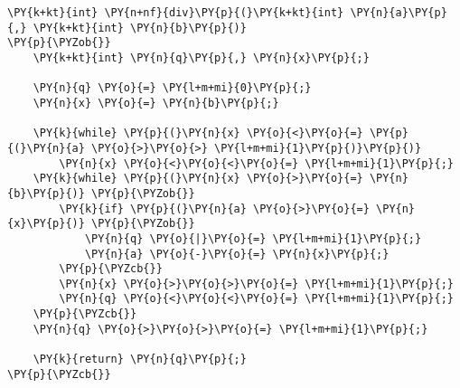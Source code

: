\begin{Verbatim}[commandchars=\\\{\}]
\PY{k+kt}{int} \PY{n+nf}{div}\PY{p}{(}\PY{k+kt}{int} \PY{n}{a}\PY{p}{,} \PY{k+kt}{int} \PY{n}{b}\PY{p}{)}
\PY{p}{\PYZob{}}
    \PY{k+kt}{int} \PY{n}{q}\PY{p}{,} \PY{n}{x}\PY{p}{;}

    \PY{n}{q} \PY{o}{=} \PY{l+m+mi}{0}\PY{p}{;}
    \PY{n}{x} \PY{o}{=} \PY{n}{b}\PY{p}{;}

    \PY{k}{while} \PY{p}{(}\PY{n}{x} \PY{o}{<}\PY{o}{=} \PY{p}{(}\PY{n}{a} \PY{o}{>}\PY{o}{>} \PY{l+m+mi}{1}\PY{p}{)}\PY{p}{)}
        \PY{n}{x} \PY{o}{<}\PY{o}{<}\PY{o}{=} \PY{l+m+mi}{1}\PY{p}{;}
    \PY{k}{while} \PY{p}{(}\PY{n}{x} \PY{o}{>}\PY{o}{=} \PY{n}{b}\PY{p}{)} \PY{p}{\PYZob{}}
        \PY{k}{if} \PY{p}{(}\PY{n}{a} \PY{o}{>}\PY{o}{=} \PY{n}{x}\PY{p}{)} \PY{p}{\PYZob{}}
            \PY{n}{q} \PY{o}{|}\PY{o}{=} \PY{l+m+mi}{1}\PY{p}{;}
            \PY{n}{a} \PY{o}{-}\PY{o}{=} \PY{n}{x}\PY{p}{;}
        \PY{p}{\PYZcb{}}
        \PY{n}{x} \PY{o}{>}\PY{o}{>}\PY{o}{=} \PY{l+m+mi}{1}\PY{p}{;}
        \PY{n}{q} \PY{o}{<}\PY{o}{<}\PY{o}{=} \PY{l+m+mi}{1}\PY{p}{;}
    \PY{p}{\PYZcb{}}
    \PY{n}{q} \PY{o}{>}\PY{o}{>}\PY{o}{=} \PY{l+m+mi}{1}\PY{p}{;}

    \PY{k}{return} \PY{n}{q}\PY{p}{;}
\PY{p}{\PYZcb{}}
\end{Verbatim}
